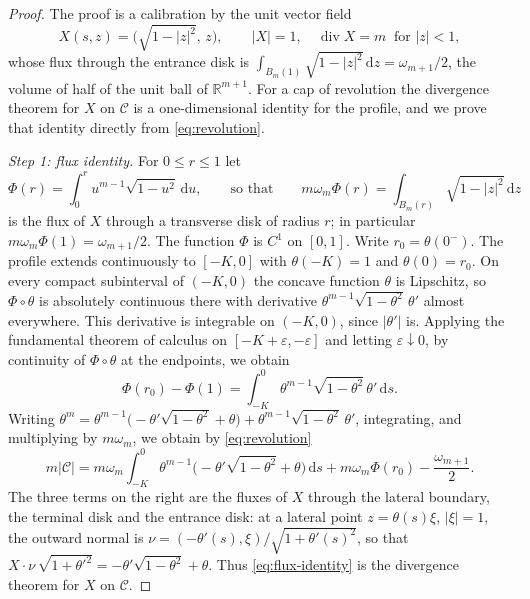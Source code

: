 \documentclass[11pt,a4paper]{article}
\numberwithin{equation}{section}
\theoremstyle{paperplain}
\theoremstyle{remark}
\newcommand{\R}{\mathbb{R}}
\newcommand{\C}{\mathcal{C}}
\newcommand{\dd}{\,\mathrm d}
\begin{document}
\begin{proof}
The proof is a calibration by the unit vector field
\[
 X(s,z)=\bigl(\sqrt{1-|z|^2},\,z\bigr),\qquad |X|=1,\quad
 \operatorname{div}X=m\ \text{ for } |z|<1,
\]
whose flux through the entrance disk is
$\int_{B_m(1)}\sqrt{1-|z|^2}\dd z=\omega_{m+1}/2$, the volume of half of the
unit ball of $\R^{m+1}$. For a cap of revolution the divergence theorem for
$X$ on $\C$ is a one-dimensional identity for the profile, and we prove
that identity directly from \eqref{eq:revolution}.

\emph{Step 1: flux identity.} For $0\le r\le1$ let
\[
 \Phi(r)=\int_0^ru^{m-1}\sqrt{1-u^2}\dd u,
 \qquad\text{so that}\qquad
 m\omega_m\Phi(r)=\int_{B_m(r)}\sqrt{1-|z|^2}\dd z
\]
is the flux of $X$ through a transverse disk of radius $r$; in particular
$m\omega_m\Phi(1)=\omega_{m+1}/2$. The function $\Phi$ is $C^1$ on $[0,1]$.
Write $r_0=\theta(0^-)$. The profile extends continuously to $[-K,0]$ with
$\theta(-K)=1$ and $\theta(0)=r_0$. On every compact subinterval of $(-K,0)$
the concave function $\theta$ is Lipschitz, so $\Phi\circ\theta$ is
absolutely continuous there with derivative
$\theta^{m-1}\sqrt{1-\theta^2}\,\theta'$ almost everywhere. This derivative
is integrable on $(-K,0)$, since $|\theta'|$ is. Applying the fundamental
theorem of calculus on $[-K+\varepsilon,-\varepsilon]$ and letting
$\varepsilon\downarrow0$, by continuity of $\Phi\circ\theta$ at the
endpoints, we obtain
\[
 \Phi(r_0)-\Phi(1)=\int_{-K}^0\theta^{m-1}\sqrt{1-\theta^2}\,\theta'\dd s.
\]
Writing $\theta^m=\theta^{m-1}\bigl(-\theta'\sqrt{1-\theta^2}+\theta\bigr)
+\theta^{m-1}\sqrt{1-\theta^2}\,\theta'$, integrating, and multiplying by
$m\omega_m$, we obtain by \eqref{eq:revolution}
\begin{equation}\label{eq:flux-identity}
 m|\C|
 =m\omega_m\int_{-K}^0\theta^{m-1}
   \bigl(-\theta'\sqrt{1-\theta^2}+\theta\bigr)\dd s
  +m\omega_m\Phi(r_0)-\frac{\omega_{m+1}}2 .
\end{equation}
The three terms on the right are the fluxes of $X$ through the lateral
boundary, the terminal disk and the entrance disk: at a lateral point
$z=\theta(s)\xi$, $|\xi|=1$, the outward normal is
$\nu=(-\theta'(s),\xi)/\sqrt{1+\theta'(s)^2}$, so that
$X\cdot\nu\,\sqrt{1+\theta'^2}=-\theta'\sqrt{1-\theta^2}+\theta$. Thus
\eqref{eq:flux-identity} is the divergence theorem for $X$ on $\C$.


\end{proof}
\end{document}
